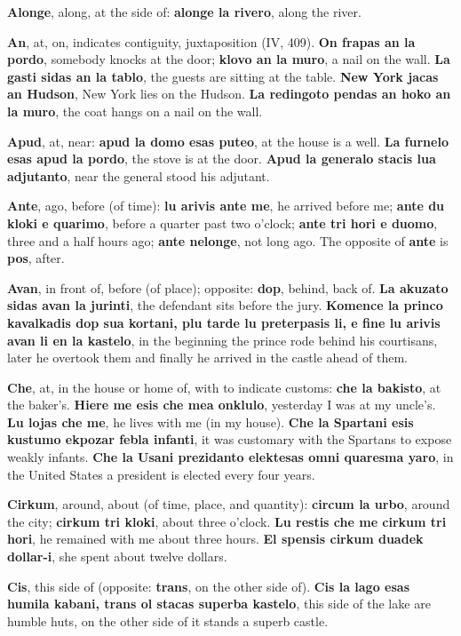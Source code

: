 \textbf{Alonge}, along, at the side of: \textbf{alonge la rivero}, along the river.

\textbf{An}, at, on, indicates contiguity, juxtaposition (IV, 409). \textbf{On frapas an la pordo}, somebody knocks at the door; \textbf{klovo an la muro}, a nail on the wall. \textbf{La gasti sidas an la tablo}, the guests are sitting at the table. \textbf{New York jacas an Hudson}, New York lies on the Hudson. \textbf{La redingoto pendas an hoko an la muro}, the coat hangs on a nail on the wall.

\textbf{Apud}, at, near: \textbf{apud la domo esas puteo}, at the house is a well. \textbf{La furnelo esas apud la pordo}, the stove is at the door. \textbf{Apud la generalo stacis lua adjutanto}, near the general stood his adjutant.

\textbf{Ante}, ago, before (of time): \textbf{lu arivis ante me}, he arrived before me; \textbf{ante du kloki e quarimo}, before a quarter past two o'clock; \textbf{ante tri hori e duomo}, three and a half hours ago; \textbf{ante nelonge}, not long ago. The opposite of \textbf{ante} is \textbf{pos}, after.

\textbf{Avan}, in front of, before (of place); opposite: \textbf{dop}, behind, back of. \textbf{La akuzato sidas avan la jurinti}, the defendant sits before the jury. \textbf{Komence la princo kavalkadis dop sua kortani, plu tarde lu preterpasis li, e fine lu arivis avan li en la kastelo}, in the beginning the prince rode behind his courtisans, later he overtook them and finally he arrived in the castle ahead of them.

\textbf{Che}, at, in the house or home of, with to indicate customs:\textbf{ che la bakisto}, at the baker's. \textbf{Hiere me esis che mea onklulo}, yesterday I was at my uncle's. \textbf{Lu lojas che me}, he lives with me (in my house). \textbf{Che la Spartani esis kustumo ekpozar febla infanti}, it was customary with the Spartans to expose weakly infants. \textbf{Che la Usani prezidanto elektesas omni quaresma yaro}, in the United States a president is elected every four years.

\textbf{Cirkum}, around, about (of time, place, and quantity): \textbf{circum la urbo}, around the city; \textbf{cirkum tri kloki}, about three o'clock. \textbf{Lu restis che me cirkum tri hori}, he remained with me about three hours. \textbf{El spensis cirkum duadek dollar-i}, she spent about twelve dollars.

\textbf{Cis}, this side of (opposite: \textbf{trans}, on the other side of). \textbf{Cis la lago esas humila kabani, trans ol stacas superba kastelo}, this side of the lake are humble huts, on the other side of it stands a superb castle.

